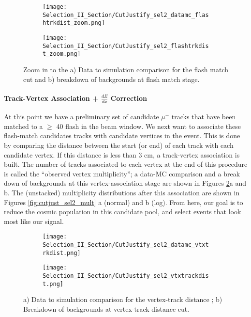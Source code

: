 \begin{figure}[h!]
\centering
  \begin{subfigure}[t]{0.4\textwidth}
    \centering
\texttt{[image: Selection\_II\_Section/CutJustify\_sel2\_datamc\_flashtrkdist\_zoom.png]}
    \caption{ }
  \end{subfigure} 
  \hspace{10 mm}
  \begin{subfigure}[t]{0.4\textwidth}
    \centering
\texttt{[image: Selection\_II\_Section/CutJustify\_sel2\_flashtrkdist\_zoom.png]}
   \caption{ }
  \end{subfigure} 
\caption{ Zoom in to the a) Data to simulation comparison for the flash match cut and b) breakdown of backgrounds at flash match stage. }
\label{fig:cutjust_sel2_flashtrkdist_zoom}
\end{figure}

\paragraph{Track-Vertex Association + $\frac{dE}{dx}$ Correction}
At this point we have a preliminary set of candidate $\mu^-$ tracks that have been matched to a $\geq$ 40 flash in the beam window. We next want to associate these flash-match candidates tracks with candidate vertices in the event. This is done by comparing the distance between the start (or end) of each track with each candidate vertex. If this distance is less than 3 cm, a track-vertex association is built.  The number of tracks associated to each vertex at the end of this procedure is called the ``observed vertex multiplicity''; a data-MC comparison and a break down of backgrounds at this vertex-association stage are shown in Figures \ref{fig:cutjust_sel2_vtxtrackdist}a and b.  The (unstacked) multiplicity distributions after this association are shown in Figures \ref{fig:cutjust_sel2_mult} a (normal) and b (log).  From here, our goal is to reduce the cosmic population in this candidate pool, and select events  that look most like our signal.

\begin{figure}[h!]
\centering
  \begin{subfigure}[t]{0.4\textwidth}
    \centering
\texttt{[image: Selection\_II\_Section/CutJustify\_sel2\_datamc\_vtxtrkdist.png]}
    \caption{ }
  \end{subfigure} 
  \hspace{10 mm}
  \begin{subfigure}[t]{0.4\textwidth}
    \centering
\texttt{[image: Selection\_II\_Section/CutJustify\_sel2\_vtxtrackdist.png]}
    \caption{ }
  \end{subfigure} 
\caption{ a) Data to simulation comparison for the vertex-track distance ; b) Breakdown of backgrounds at vertex-track distance cut. }
\label{fig:cutjust_sel2_vtxtrackdist}
\end{figure}

